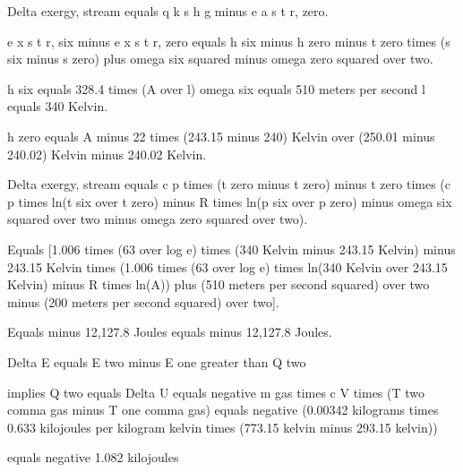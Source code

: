 Delta exergy, stream equals q k s h g minus e a s t r, zero.

e x s t r, six minus e x s t r, zero equals h six minus h zero minus t zero times (s six minus s zero) plus omega six squared minus omega zero squared over two.

h six equals 328.4 times (A over l) omega six equals 510 meters per second l equals 340 Kelvin.

h zero equals A minus 22 times (243.15 minus 240) Kelvin over (250.01 minus 240.02) Kelvin minus 240.02 Kelvin.

Delta exergy, stream equals c p times (t zero minus t zero) minus t zero times (c p times ln(t six over t zero) minus R times ln(p six over p zero) minus omega six squared over two minus omega zero squared over two).

Equals [1.006 times (63 over log e) times (340 Kelvin minus 243.15 Kelvin) minus 243.15 Kelvin times (1.006 times (63 over log e) times ln(340 Kelvin over 243.15 Kelvin) minus R times ln(A)) plus (510 meters per second squared) over two minus (200 meters per second squared) over two].

Equals minus 12,127.8 Joules equals minus 12,127.8 Joules.

Delta E equals E two minus E one greater than Q two

implies Q two equals Delta U equals negative m gas times c V times (T two comma gas minus T one comma gas) equals negative (0.00342 kilograms times 0.633 kilojoules per kilogram kelvin times (773.15 kelvin minus 293.15 kelvin))

equals negative 1.082 kilojoules
